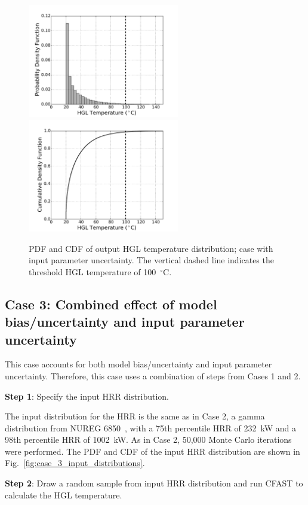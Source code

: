 \documentclass[12pt]{article}
\begin{document}
\begin{figure}[p]
\includegraphics[width=2.6in]{Figures/output_PDF_2_input}
\includegraphics[width=2.6in]{Figures/output_CDF_2_input}
\caption{PDF and CDF of output HGL temperature distribution; case with input parameter uncertainty. The vertical dashed line indicates the threshold HGL temperature of 100~$^\circ$C.}
\label{fig:case_2_output_distributions}
\end{figure}


\clearpage


\subsection{Case 3: Combined effect of model bias/uncertainty and input parameter uncertainty}

This case accounts for both model bias/uncertainty and input parameter uncertainty. Therefore, this case uses a combination of steps from Cases 1 and 2.

\textbf{Step 1}: Specify the input HRR distribution.

The input distribution for the HRR is the same as in Case 2, a gamma distribution from NUREG 6850~\cite{NUREG_6850}, with a 75th percentile HRR of 232~kW and a 98th percentile HRR of 1002~kW. As in Case 2, 50,000 Monte Carlo iterations were performed. The PDF and CDF of the input HRR distribution are shown in Fig.~\ref{fig:case_3_input_distributions}.

\textbf{Step 2}: Draw a random sample from input HRR distribution and run CFAST to calculate the HGL temperature.
\end{document}
